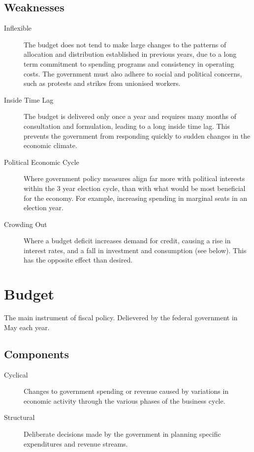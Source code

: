 \documentclass[a4paper,11pt]{article}
\begin{document}
\subsection{Weaknesses}

\begin{description}
\item [Inflexible] The budget does not tend to make large changes to the
	patterns of allocation and distribution established in previous years, due
	to a long term commitment to spending programs and consistency in operating
	costs. The government must also adhere to social and political concerns,
	such as protests and strikes from unionised workers.
\item [Inside Time Lag] The budget is delivered only once a year and requires
	many months of consultation and formulation, leading to a long inside time
	lag. This prevents the government from responding quickly to sudden changes
	in the economic climate.
\item [Political Economic Cycle] Where government policy measures align far more
	with political interests within the 3 year election cycle, than with what
	would be most beneficial for the economy. For example, increasing spending
	in marginal seats in an election year.
\item [Crowding Out] Where a budget deficit increases demand for credit, causing
	a rise in interest rates, and a fall in investment and consumption (see
	below). This has the opposite effect than desired.
\end{description}



\section{Budget}

The main instrument of fiscal policy. Delievered by the federal government in
May each year.


\subsection{Components}

\begin{description}
\item [Cyclical] Changes to government spending or revenue caused by variations
	in economic activity through the various phases of the business cycle.
\item [Structural] Deliberate decisions made by the government in planning
	specific expenditures and revenue streams.
\end{description}
\end{document}
